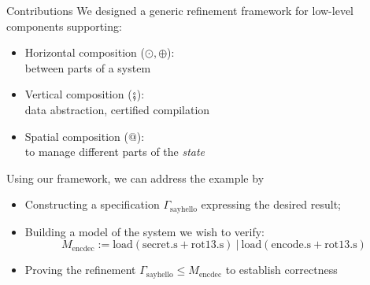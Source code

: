 \documentclass[aspectratio=1610,mathserif]{beamer}
\newcommand{\kw}[1]{\ensuremath{ \mathrm{#1} }}
\begin{document}
\begin{frame}{Contributions}
  We designed a generic refinement framework for low-level components supporting:
  \begin{itemize}
    \item Horizontal composition ($\odot, \oplus$): \\
      between parts of a system
    \item Vertical composition ($\fatsemi$): \\
      data abstraction, certified compilation
    \item Spatial composition ($\mathbin@$): \\
      to manage different parts of the \emph{state}
  \end{itemize}

  \pause \vfill
  Using our framework,
  we can address the example by
  \begin{itemize}
    \item Constructing a specification $\Gamma_\kw{sayhello}$
      expressing the desired result;
    \item Building a model of the system we wish to verify:
      \[
        M_\kw{encdec} :=
        \kw{load}(\kw{secret.s} + \kw{rot13.s})
        \:\mathbin{\mathtt{|}}\:
        \kw{load}(\kw{encode.s} + \kw{rot13.s})
      \]
    \item Proving the refinement
      $
        \Gamma_\kw{sayhello} \le
        M_\kw{encdec}
      $
      to establish correctness
  \end{itemize}

%
\end{frame}
\end{document}
